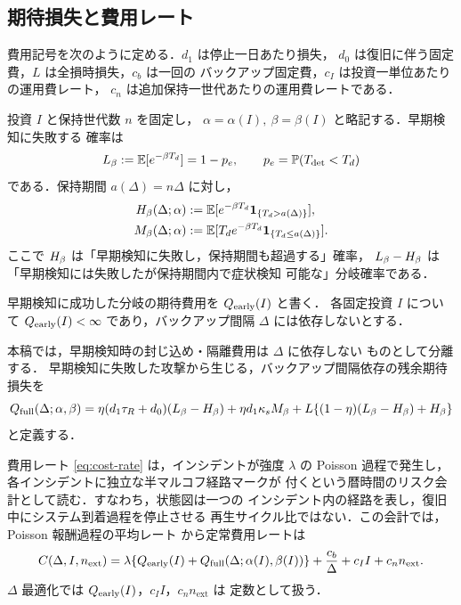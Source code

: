 \subsection{期待損失と費用レート}

費用記号を次のように定める．$d_1$ は停止一日あたり損失，
$d_0$ は復旧に伴う固定費，$L$ は全損時損失，$c_b$ は一回の
バックアップ固定費，$c_I$ は投資一単位あたりの運用費レート，
$c_n$ は追加保持一世代あたりの運用費レートである．

投資 $I$ と保持世代数 $n$ を固定し，
$\alpha=\alpha(I),\ \beta=\beta(I)$ と略記する．早期検知に失敗する
確率は
\[
  L_\beta:=\mathbb{E}[e^{-\beta T_d}]=1-p_e,\qquad
  p_e=\mathbb{P}(T_{\mathrm{det}}<T_d)
\]
である．保持期間 $a(\Delta)=n\Delta$ に対し，
\begin{align}
  H_\beta(\Delta;\alpha)
  &:=\mathbb{E}[e^{-\beta T_d}\mathbf{1}_{\{T_d>a(\Delta)\}}],\\
  M_\beta(\Delta;\alpha)
  &:=\mathbb{E}[T_d e^{-\beta T_d}\mathbf{1}_{\{T_d\le a(\Delta)\}}].
\end{align}
ここで $H_\beta$ は「早期検知に失敗し，保持期間も超過する」確率，
$L_\beta-H_\beta$ は「早期検知には失敗したが保持期間内で症状検知
可能な」分岐確率である．

\begin{assumption}[早期検知費用]
早期検知に成功した分岐の期待費用を $Q_{\mathrm{early}}(I)$ と書く．
各固定投資 $I$ について $Q_{\mathrm{early}}(I)<\infty$ であり，バックアップ間隔
$\Delta$ には依存しないとする．
\end{assumption}

本稿では，早期検知時の封じ込め・隔離費用は $\Delta$ に依存しない
ものとして分離する．
早期検知に失敗した攻撃から生じる，バックアップ間隔依存の残余期待
損失を
\begin{equation}
  Q_{\mathrm{full}}(\Delta;\alpha,\beta)
  =\eta(d_1\tau_R+d_0)(L_\beta-H_\beta)
  +\eta d_1\kappa_sM_\beta
  +L\{(1-\eta)(L_\beta-H_\beta)+H_\beta\}
  \label{eq:qfull}
\end{equation}
と定義する．

費用レート \eqref{eq:cost-rate} は，インシデントが強度 $\lambda$ の
Poisson 過程で発生し，各インシデントに独立な半マルコフ経路マークが
付くという暦時間のリスク会計として読む．すなわち，状態図は一つの
インシデント内の経路を表し，復旧中にシステム到着過程を停止させる
再生サイクル比ではない．この会計では，Poisson 報酬過程の平均レート
から定常費用レートは
\begin{equation}
  C(\Delta,I,n_{\mathrm{ext}})
  =\lambda\{Q_{\mathrm{early}}(I)+Q_{\mathrm{full}}(\Delta;\alpha(I),\beta(I))\}
  +\frac{c_b}{\Delta}+c_I I+c_n n_{\mathrm{ext}}.
  \label{eq:cost-rate}
\end{equation}
$\Delta$ 最適化では $Q_{\mathrm{early}}(I)$，$c_I I$，$c_n n_{\mathrm{ext}}$ は
定数として扱う．
